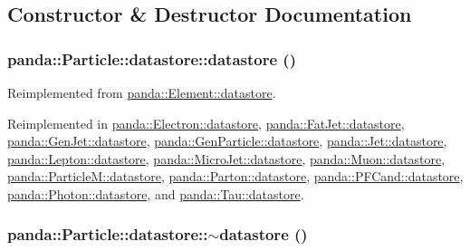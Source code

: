 \subsection{Constructor \& Destructor Documentation}
\hypertarget{structpanda_1_1Particle_1_1datastore_a6e59a47437e52ced2f9605926e0de284}{
\subsubsection[{datastore}]{\setlength{\rightskip}{0pt plus 5cm}panda::Particle::datastore::datastore ()}}
\label{structpanda_1_1Particle_1_1datastore_a6e59a47437e52ced2f9605926e0de284}


Reimplemented from \hyperlink{structpanda_1_1Element_1_1datastore_a19506caec8d63f38674506dbb8283495}{panda::Element::datastore}.

Reimplemented in \hyperlink{structpanda_1_1Electron_1_1datastore_a2be5528c91b18d47c8c277a4f21ca899}{panda::Electron::datastore}, \hyperlink{structpanda_1_1FatJet_1_1datastore_a9705a085f7cb1355b03cbfff4f580dbf}{panda::FatJet::datastore}, \hyperlink{structpanda_1_1GenJet_1_1datastore_ad0ca5d1b0381eb65489787ba810fa69a}{panda::GenJet::datastore}, \hyperlink{structpanda_1_1GenParticle_1_1datastore_ad1aab7880b9699f04e712abc69799953}{panda::GenParticle::datastore}, \hyperlink{structpanda_1_1Jet_1_1datastore_ae927a2e58d5ac6418b839d01dac0bd37}{panda::Jet::datastore}, \hyperlink{structpanda_1_1Lepton_1_1datastore_adf84bb1f833eb50c3c73d81af211496e}{panda::Lepton::datastore}, \hyperlink{structpanda_1_1MicroJet_1_1datastore_adac05a4e9f5487a0932162ad3781f8aa}{panda::MicroJet::datastore}, \hyperlink{structpanda_1_1Muon_1_1datastore_a85904b7d723e3e95abf0901bbf3db103}{panda::Muon::datastore}, \hyperlink{structpanda_1_1ParticleM_1_1datastore_acc9af307e2c4fee9bc5d9bbb37ad6124}{panda::ParticleM::datastore}, \hyperlink{structpanda_1_1Parton_1_1datastore_aa447f1603ab6cfdf50e6406d1ef00819}{panda::Parton::datastore}, \hyperlink{structpanda_1_1PFCand_1_1datastore_a43d1760f6d3b403fea68a112cca0b2a7}{panda::PFCand::datastore}, \hyperlink{structpanda_1_1Photon_1_1datastore_aaaad2d7371a41dbeff49ca7689cf5b08}{panda::Photon::datastore}, and \hyperlink{structpanda_1_1Tau_1_1datastore_a48102b990097fe44c912c4a155786846}{panda::Tau::datastore}.\hypertarget{structpanda_1_1Particle_1_1datastore_afb2d9f4926afbfa8e0f15f0d8d98094a}{
\subsubsection[{$\sim$datastore}]{\setlength{\rightskip}{0pt plus 5cm}panda::Particle::datastore::$\sim$datastore ()}}
\label{structpanda_1_1Particle_1_1datastore_afb2d9f4926afbfa8e0f15f0d8d98094a}


